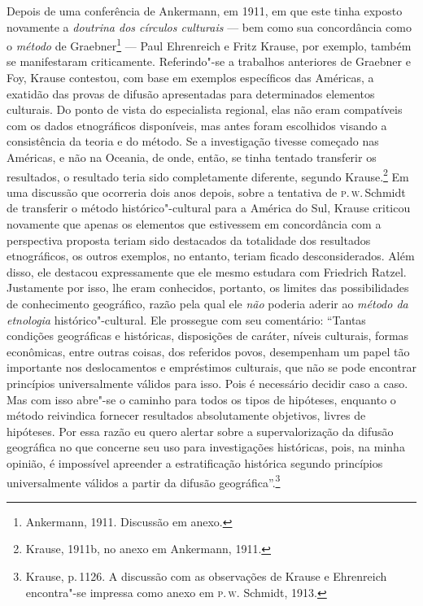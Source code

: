 Depois de uma conferência de Ankermann, em 1911, em que este tinha
exposto novamente a \textit{doutrina dos círculos culturais} --- bem como sua
concordância como o \textit{método} de Graebner\footnote{Ankermann, 1911.
  Discussão em anexo.} --- Paul Ehrenreich e Fritz Krause, por exemplo,
também se manifestaram criticamente. Referindo"-se a trabalhos
anteriores de Graebner e Foy, Krause contestou, com base em exemplos
específicos das Américas, a exatidão das provas de difusão apresentadas
para determinados elementos culturais. Do ponto de vista do especialista
regional, elas não eram compatíveis com os dados etnográficos
disponíveis, mas antes foram escolhidos visando a consistência da teoria
e do método. Se a investigação tivesse começado nas Américas, e não na
Oceania, de onde, então, se tinha tentado transferir os resultados, o
resultado teria sido completamente diferente, segundo Krause.\footnote{Krause,
  1911b, no anexo em Ankermann, 1911.} Em uma discussão que ocorreria
dois anos depois, sobre a tentativa de \textsc{p}.\,\textsc{w}.\,Schmidt de transferir o
método histórico"-cultural para a América do Sul, Krause criticou
novamente que apenas os elementos que estivessem em concordância com a
perspectiva proposta teriam sido destacados da totalidade dos resultados
etnográficos, os outros exemplos, no entanto, teriam ficado
desconsiderados. Além disso, ele destacou expressamente que ele mesmo
estudara com Friedrich Ratzel. Justamente por isso, lhe eram
conhecidos, portanto, os limites das possibilidades de conhecimento
geográfico, razão pela qual ele \textit{não} poderia aderir ao \textit{método da
etnologia} histórico"-cultural. Ele prossegue com seu comentário:
``Tantas condições geográficas e históricas, disposições de caráter,
níveis culturais, formas econômicas, entre outras coisas, dos referidos
povos, desempenham um papel tão importante nos deslocamentos e
empréstimos culturais, que não se pode encontrar princípios
universalmente válidos para isso. Pois é necessário decidir caso a
caso. Mas com isso abre"-se o caminho para todos os tipos de hipóteses,
enquanto o método reivindica fornecer resultados absolutamente
objetivos, livres de hipóteses. Por essa razão eu quero alertar sobre a
supervalorização da difusão geográfica no que concerne seu uso para
investigações históricas, pois, na minha opinião, é impossível apreender
a estratificação histórica segundo princípios universalmente válidos a
partir da difusão geográfica''.\footnote{Krause, p.\,1126. A discussão
  com as observações de Krause e Ehrenreich encontra"-se impressa como
  anexo em \textsc{p}.\,\textsc{w}. Schmidt, 1913.}

